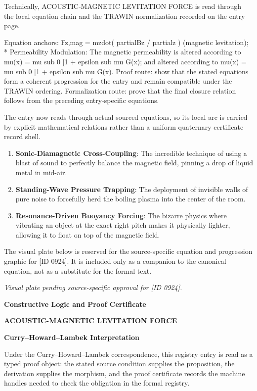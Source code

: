 Technically, ACOUSTIC-MAGNETIC LEVITATION FORCE is read through the local equation chain and the TRAWIN normalization recorded on the entry page.

Equation anchors: Fz,mag = mzdot( partialBz / partialz ) (magnetic levitation); * Permeability Modulation: The magnetic permeability is altered according to mu(x) = mu sub 0 [1 + epsilon sub mu G(x); and altered according to mu(x) = mu sub 0 [1 + epsilon sub mu G(x). Proof route: show that the stated equations form a coherent progression for the entry and remain compatible under the TRAWIN ordering. Formalization route: prove that the final closure relation follows from the preceding entry-specific equations.

The entry now reads through actual sourced equations, so its local arc is carried by explicit mathematical relations rather than a uniform quaternary certificate record shell.
\endgroup

\begin{enumerate}[leftmargin=1.6em,itemsep=6pt,topsep=4pt]
\item \textbf{Sonic-Diamagnetic Cross-Coupling}: The incredible technique of using a blast of sound to perfectly balance the magnetic field, pinning a drop of liquid metal in mid-air.
\item \textbf{Standing-Wave Pressure Trapping}: The deployment of invisible walls of pure noise to forcefully herd the boiling plasma into the center of the room.
\item \textbf{Resonance-Driven Buoyancy Forcing}: The bizarre physics where vibrating an object at the exact right pitch makes it physically lighter, allowing it to float on top of the magnetic field.
\end{enumerate}

\begingroup\footnotesize\sloppy
The visual plate below is reserved for the source-specific equation and progression graphic for [ID 0924]. It is included only as a companion to the canonical equation, not as a substitute for the formal text.
\par\endgroup
\begingroup\footnotesize\itshape
Visual plate pending source-specific approval for [ID 0924].
\par\endgroup

\clearpage
\begingroup\tzpsupportsetup
\noindent\textbf{\fontsize{10.8pt}{12.8pt}\selectfont [ID 0924] Constructive Logic and Proof Certificate}\par
\noindent\textbf{\fontsize{10pt}{12pt}\selectfont ACOUSTIC-MAGNETIC LEVITATION FORCE}\par
\vspace{0.45em}
\begingroup
\footnotesize
\setlength{\parskip}{0.22em}
\setlength{\parindent}{0pt}
\noindent\textbf{Curry--Howard--Lambek Interpretation}\par
Under the Curry--Howard--Lambek correspondence, this registry entry is read as a typed proof
object: the stated source condition supplies the proposition, the derivation supplies the
morphism, and the proof certificate records the machine handles needed to check the obligation
in the formal registry.

